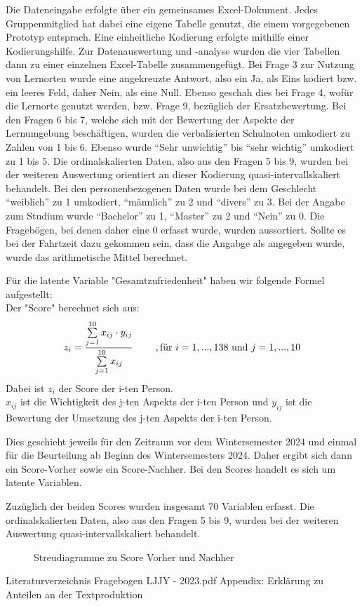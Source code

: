 \documentclass[11pt, a4paper]{article}
\begin{document}
	Die Dateneingabe erfolgte über ein gemeinsames Excel-Dokument. Jedes Gruppenmitglied hat dabei eine eigene Tabelle genutzt, die einem vorgegebenen Prototyp entsprach. Eine einheitliche Kodierung erfolgte mithilfe einer Kodierungshilfe. 
	Zur Datenauswertung und -analyse wurden die vier Tabellen dann zu einer einzelnen Excel-Tabelle zusammengefügt. 
	Bei Frage 3 zur Nutzung von Lernorten wurde eine angekreuzte Antwort, also ein Ja, als Eins kodiert bzw. ein leeres Feld, daher Nein, als eine Null. Ebenso geschah dies bei Frage 4, wofür die Lernorte genutzt werden, bzw. Frage 9, bezüglich der Ersatzbewertung.
	Bei den Fragen 6 bis 7, welche sich mit der Bewertung der Aspekte der Lernumgebung beschäftigen, wurden die verbalisierten Schulnoten umkodiert zu Zahlen von 1 bis 6. Ebenso wurde “Sehr unwichtig” bis “sehr wichtig” umkodiert zu 1 bis 5.
	Die ordinalskalierten Daten, also aus den Fragen 5 bis 9, wurden bei der weiteren Auswertung orientiert an dieser Kodierung quasi-intervallskaliert behandelt.
	Bei den personenbezogenen Daten wurde bei dem Geschlecht “weiblich” zu 1 umkodiert, “männlich” zu 2 und “divers” zu 3. 
	Bei der Angabe zum Studium wurde “Bachelor” zu 1, “Master” zu 2 und “Nein” zu 0. Die Fragebögen, bei denen daher eine 0 erfasst wurde, wurden aussortiert.
	Sollte es bei der Fahrtzeit dazu gekommen sein, dass die Angabge als  angegeben wurde, wurde das arithmetische Mittel berechnet.
	
	Für die latente Variable "Gesamtzufriedenheit" haben wir folgende Formel aufgestellt:  \\
	Der "Score" berechnet sich aus:
	\begin{equation*}
		z_i = \frac{\sum\limits_{j=1}^{10}x_{ij}\cdot  y_{ij}}{\sum\limits_{j=1}^{10}x_{ij}} \hspace{0.8cm} , \text{für} \ 
		i=1,...,138\  \text{und} \ j=1,...,10
	\end{equation*} 
	Dabei ist $z_i$ der Score der i-ten Person. \\
	$x_{ij}$ ist die Wichtigkeit des j-ten Aspekts der i-ten Person und
	$y_{ij}$ ist die Bewertung der Umsetzung des j-ten Aspekts der i-ten Person.
	
	
	Dies geschieht jeweils für den Zeitraum vor dem Wintersemester 2024 und einmal für die Beurteilung ab Beginn des Wintersemesters 2024. Daher ergibt sich dann ein Score-Vorher sowie ein Score-Nachher. Bei den Scores handelt es sich um latente Variablen.
	
	Zuzüglich der beiden Scores wurden insgesamt 70 Variablen erfasst.
	Die ordinalskalierten Daten, also aus den Fragen 5 bis 9, wurden bei der weiteren Auswertung quasi-intervallskaliert behandelt.
	
	\newpage
	\begin{figure}
		\centering 
		\vspace{-2cm}
		\caption{Streudiagramme zu Score Vorher und Nachher}
	\end{figure}
	
	\leavevmode
	
	
	
	
	\newpage
	Literaturverzeichnis
	\newpage 
	 {Fragebogen LJJY - 2023.pdf}
	\newpage Appendix: Erklärung zu Anteilen an der Textproduktion
	
\end{document}
